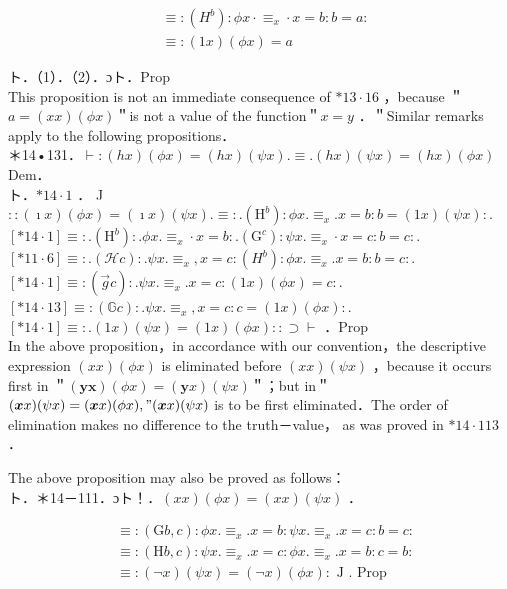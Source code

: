 \documentclass[10pt]{article}
\begin{document}
\begin{align*}
& \equiv:\left(H^{b}\right): \phi x \cdot \equiv_{x} \cdot x=b: b=a: \\
& \equiv:(1 x)(\phi x)=a \tag{2}
\end{align*}


ト．（1）．（2）．ɔト．Prop\\
This proposition is not an immediate consequence of $* 13 \cdot 16$ ，because ＂$a=(x x)(\phi x)$＂is not a value of the function＂$x=y$ ．＂Similar remarks apply to the following propositions．\\
＊14•131．$\vdash:(h x)(\phi x)=(h x)(\psi x) . \equiv .(h x)(\psi x)=(h x)(\phi x)$\\
Dem．\\
ト．$* 14 \cdot 1$ ． J $::(\imath x)(\phi x)=(\imath x)(\psi x) . \equiv: .\left(\mathrm{H}^{b}\right): \phi x . \equiv_{x} . x=b: b=(1 x)(\psi x):$.\\
$[* 14 \cdot 1] \equiv: .\left(\mathrm{H}^{b}\right): . \phi x . \equiv_{x} \cdot x=b: .\left(\mathrm{G}^{c}\right): \psi x . \equiv_{x} \cdot x=c: b=c:$.\\
$[* 11 \cdot 6] \equiv: .(\mathcal{H} c): . \psi x . \equiv_{x}, x=c:\left(H^{b}\right): \phi x . \equiv_{x} . x=b: b=c:$.\\
$[* 14 \cdot 1] \equiv:(\vec{g} c): . \psi x . \equiv_{x} . x=c:(1 x)(\phi x)=c:$.\\
$[* 14 \cdot 13] \equiv:(\mathbb{G} c): . \psi x . \equiv_{x}, x=c: c=(1 x)(\phi x):$.\\
$[* 14 \cdot 1] \equiv: .(1 x)(\psi x)=(1 x)(\phi x):: \supset \vdash$ ．Prop\\
In the above proposition，in accordance with our convention，the descriptive expression $(x x)(\phi x)$ is eliminated before $(x x)(\psi x)$ ，because it occurs first in ＂$(\boldsymbol{y} \boldsymbol{x})(\phi x)=(\boldsymbol{y} x)(\psi x)$＂；but in＂$(\boldsymbol{x} x)(\psi x)=(\boldsymbol{x} x)(\phi x), "(\boldsymbol{x} x)(\psi x)$ is to be first eliminated．The order of elimination makes no difference to the truth－value， as was proved in $* 14 \cdot 113$ ．

The above proposition may also be proved as follows：\\
ト．＊14－111．ɔト！．$(x x)(\phi x)=(x x)(\psi x)$ ．

$$
\begin{aligned}
& \equiv:(\mathrm{G} b, c): \phi x . \equiv_{x} . x=b: \psi x . \equiv_{x} . x=c: b=c: \\
& \equiv:(\mathrm{H} b, c): \psi x . \equiv_{x} . x=c: \phi x . \equiv_{x} . x=b: c=b: \\
& \equiv:(\neg x)(\psi x)=(\neg x)(\phi x): \text { J } . \text { Prop }
\end{aligned}
$$
\end{document}
